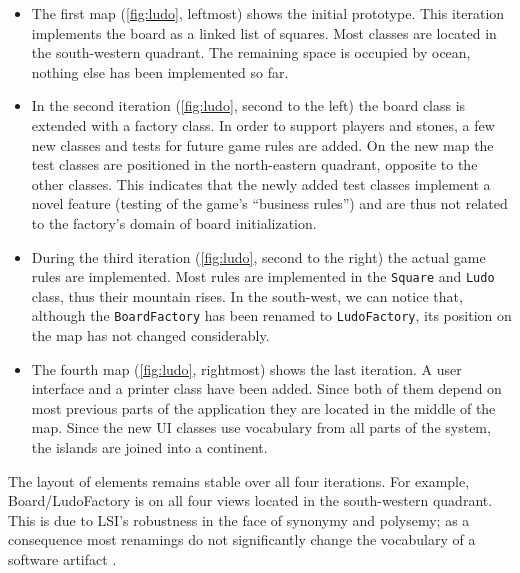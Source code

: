 \begin{itemize}

\item The first map (\autoref{fig:ludo}, leftmost) shows the initial prototype. This iteration implements the board as a linked list of squares. Most classes are located in the south-western quadrant. The remaining space is occupied by ocean, nothing else has been implemented so far.

\item In the second iteration (\autoref{fig:ludo}, second to the left) the board class is extended with a factory class. In order to support players and stones, a few new classes and tests for future game rules are added. On the new map the test classes are positioned in the north-eastern quadrant, opposite to the other classes. This indicates that the newly added test classes implement a novel feature (\ie testing of the game's ``business rules'') and are thus not related to the factory's domain of board initialization. 

\item During the third iteration (\autoref{fig:ludo}, second to the right) the actual game rules are implemented. Most rules are implemented in the {\tt Square} and {\tt Ludo} class, thus their mountain rises. In the south-west, we can notice that, although the {\tt BoardFactory} has been renamed to {\tt LudoFactory}, its position on the map has not changed considerably. 

\item The fourth map (\autoref{fig:ludo}, rightmost) shows the last iteration. A user interface and a printer class have been added. Since both of them depend on most previous parts of the application they are located in the middle of the map. Since the new UI classes use vocabulary from all parts of the system, the islands are joined into a continent.

\end{itemize}

The layout of elements remains stable over all four iterations.  For example, Board/LudoFactory is on all four views located in the south-western quadrant. This is due to LSI's robustness in the face of synonymy and polysemy; as a consequence most renamings do not significantly change the vocabulary of a software artifact \cite{Kuhn07a}.


